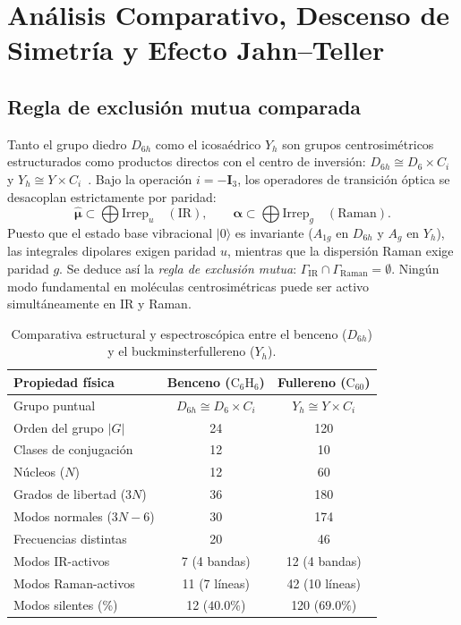 \section{Análisis Comparativo, Descenso de Simetría y Efecto Jahn--Teller}
\label{sec:comparison}

\subsection{Regla de exclusión mutua comparada}
Tanto el grupo diedro $D_{6h}$ como el icosaédrico $Y_h$ son grupos centrosimétricos estructurados como productos directos con el centro de inversión: $D_{6h} \cong D_6 \times C_i$ y $Y_h \cong Y \times C_i$~\cite{Ramadevi2019}. Bajo la operación $i = -\mathbf{I}_3$, los operadores de transición óptica se desacoplan estrictamente por paridad:
\begin{equation}
\hat{\bm{\mu}} \subset \bigoplus \text{Irrep}_u \quad (\text{IR}), \qquad \bm{\alpha} \subset \bigoplus \text{Irrep}_g \quad (\text{Raman}).
\end{equation}
Puesto que el estado base vibracional $|0\rangle$ es invariante ($A_{1g}$ en $D_{6h}$ y $A_g$ en $Y_h$), las integrales dipolares exigen paridad $u$, mientras que la dispersión Raman exige paridad $g$. Se deduce así la \emph{regla de exclusión mutua}: $\Gamma_{\text{IR}} \cap \Gamma_{\text{Raman}} = \emptyset$. Ningún modo fundamental en moléculas centrosimétricas puede ser activo simultáneamente en IR y Raman.

\begin{table}[b]
\centering
\scriptsize
\setlength{\tabcolsep}{4pt}
\renewcommand{\arraystretch}{0.9}
\caption{\label{tab:comparacion_sistemas}Comparativa estructural y espectroscópica entre el benceno ($D_{6h}$) y el buckminsterfullereno ($Y_h$).}
\begin{ruledtabular}
\begin{tabular}{lcc}
Propiedad física & Benceno ($\text{C}_6\text{H}_6$) & Fullereno ($\text{C}_{60}$) \\
\hline
Grupo puntual & $D_{6h} \cong D_6 \times C_i$ & $Y_h \cong Y \times C_i$ \\
Orden del grupo $|G|$ & 24 & 120 \\
Clases de conjugación & 12 & 10 \\
Núcleos ($N$) & 12 & 60 \\
Grados de libertad ($3N$) & 36 & 180 \\
Modos normales ($3N-6$) & 30 & 174 \\
Frecuencias distintas & 20 & 46 \\
Modos IR-activos & 7 (4 bandas) & 12 (4 bandas) \\
Modos Raman-activos & 11 (7 líneas) & 42 (10 líneas) \\
Modos silentes (\%) & 12 ($40.0\%$) & 120 ($69.0\%$) \\
\end{tabular}
\end{ruledtabular}
\end{table}


